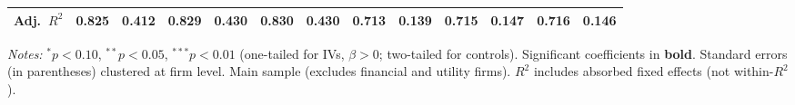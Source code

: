 \begin{landscape}
\begin{table}[H]
\begin{tabular}{lcccccccccccc}
Adj.~$R^2$ & 0.825 & 0.412 & 0.829 & 0.430 & 0.830 & 0.430 & 0.713 & 0.139 & 0.715 & 0.147 & 0.716 & 0.146 \\
\bottomrule
\end{tabular}
\begin{minipage}{\linewidth}
\vspace{2pt}\scriptsize
\textit{Notes:} $^{*}p<0.10$, $^{**}p<0.05$, $^{***}p<0.01$ (one-tailed for IVs, $\beta > 0$; two-tailed for controls).
 Significant coefficients in \textbf{bold}.
 Standard errors (in parentheses) clustered at firm level.
 Main sample (excludes financial and utility firms).
 $R^2$ includes absorbed fixed effects (not within-$R^2$).
\end{minipage}
\end{table}
\end{landscape}